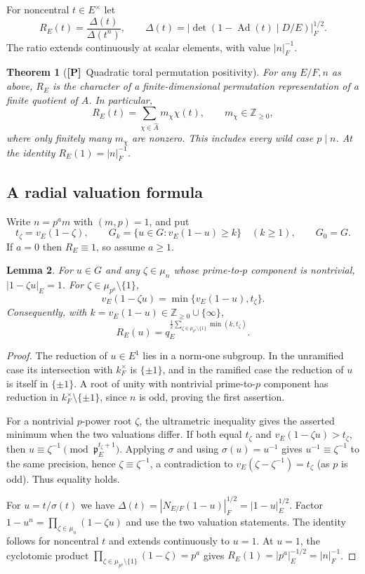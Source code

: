 \documentclass[11pt]{article}
\newcommand{\Ptag}{\textnormal{\textbf{[P]}}}
\theoremstyle{plain}
\newtheorem{theorem}{Theorem}[section]
\newtheorem{lemma}[theorem]{Lemma}
\theoremstyle{definition}
\begin{document}
For noncentral $t\in E^\times$ let
\[
 R_E(t)=\frac{\Delta(t)}{\Delta(t^n)},\qquad
 \Delta(t)=\bigl|\det(1-\operatorname{Ad}(t)\mid D/E)\bigr|_F^{1/2}.
\]
The ratio extends continuously at scalar elements, with value $|n|_F^{-1}$.

\begin{theorem}[\Ptag\ Quadratic toral permutation positivity]\label{thm:main}
For any $E/F,n$ as above, $R_E$ is the character of a finite-dimensional permutation representation of a finite quotient of $A$. In particular,
\[
 R_E(t)=\sum_{\chi\in\widehat A}m_\chi\chi(t),\qquad m_\chi\in\mathbb Z_{\geq0},
\]
where only finitely many $m_\chi$ are nonzero. This includes every wild case $p\mid n$. At the identity $R_E(1)=|n|_F^{-1}$.
\end{theorem}

\subsection{A radial valuation formula}
Write $n=p^a m$ with $(m,p)=1$, and put
\[
 t_\zeta=v_E(1-\zeta),\qquad
 G_k=\{u\in G:v_E(1-u)\geq k\}\quad(k\geq1),\qquad G_0=G.
\]
If $a=0$ then $R_E\equiv1$, so assume $a\geq1$.

\begin{lemma}\label{lem:valuations}
For $u\in G$ and any $\zeta\in\mu_n$ whose prime-to-$p$ component is nontrivial, $|1-\zeta u|_E=1$. For $\zeta\in\mu_{p^a}\setminus\{1\}$,
\[
 v_E(1-\zeta u)=\min\{v_E(1-u),t_\zeta\}.
\]
Consequently, with $k=v_E(1-u)\in\mathbb Z_{\geq0}\cup\{\infty\}$,
\begin{equation}\label{eq:radial}
 R_E(u)=q_E^{\frac12\sum_{\zeta\in\mu_{p^a}\setminus\{1\}}\min(k,t_\zeta)}.
\end{equation}
\end{lemma}
\begin{proof}
The reduction of $u\in E^1$ lies in a norm-one subgroup. In the unramified case its intersection with $k_F^\times$ is $\{\pm1\}$, and in the ramified case the reduction of $u$ is itself in $\{\pm1\}$. A root of unity with nontrivial prime-to-$p$ component has reduction in $k_F^\times\setminus\{\pm1\}$, since $n$ is odd, proving the first assertion.

For a nontrivial $p$-power root $\zeta$, the ultrametric inequality gives the asserted minimum when the two valuations differ. If both equal $t_\zeta$ and $v_E(1-\zeta u)>t_\zeta$, then $u\equiv\zeta^{-1}\pmod{\mathfrak p_E^{t_\zeta+1}}$. Applying $\sigma$ and using $\sigma(u)=u^{-1}$ gives $u^{-1}\equiv\zeta^{-1}$ to the same precision, hence $\zeta\equiv\zeta^{-1}$, a contradiction to $v_E(\zeta-\zeta^{-1})=t_\zeta$ (as $p$ is odd). Thus equality holds.

For $u=t/\sigma(t)$ we have
$\Delta(t)=|N_{E/F}(1-u)|_F^{1/2}=|1-u|_E^{1/2}$.
Factor $1-u^n=\prod_{\zeta\in\mu_n}(1-\zeta u)$ and use the two valuation statements. The identity follows for noncentral $t$ and extends continuously to $u=1$. At $u=1$, the cyclotomic product $\prod_{\zeta\in\mu_{p^a}\setminus\{1\}}(1-\zeta)=p^a$ gives $R_E(1)=|p^a|_E^{-1/2}=|n|_F^{-1}$.
\end{proof}
\end{document}

